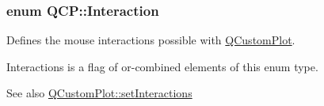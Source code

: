 \subsubsection[{\texorpdfstring{Interaction}{Interaction}}]{\setlength{\rightskip}{0pt plus 5cm}enum {\bf Q\+C\+P\+::\+Interaction}}\hypertarget{namespaceQCP_a2ad6bb6281c7c2d593d4277b44c2b037}{}\label{namespaceQCP_a2ad6bb6281c7c2d593d4277b44c2b037}
Defines the mouse interactions possible with \hyperlink{classQCustomPlot}{Q\+Custom\+Plot}.

{\ttfamily Interactions} is a flag of or-\/combined elements of this enum type.

\begin{DoxySeeAlso}{See also}
\hyperlink{classQCustomPlot_a5ee1e2f6ae27419deca53e75907c27e5}{Q\+Custom\+Plot\+::set\+Interactions} 
\end{DoxySeeAlso}
